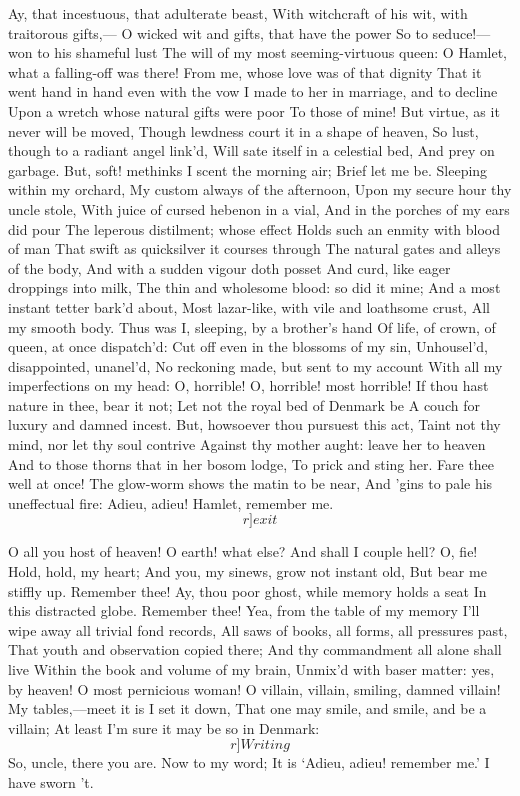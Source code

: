 \documentclass[11pt]{book}
\begin{document}
	Ay, that incestuous, that adulterate beast,
	With witchcraft of his wit, with traitorous gifts,---
	O wicked wit and gifts, that have the power
	So to seduce!---won to his shameful lust
	The will of my most seeming-virtuous queen:
	O Hamlet, what a falling-off was there!
	From me, whose love was of that dignity
	That it went hand in hand even with the vow
	I made to her in marriage, and to decline
	Upon a wretch whose natural gifts were poor
	To those of mine!
	But virtue, as it never will be moved,
	Though lewdness court it in a shape of heaven,
	So lust, though to a radiant angel link'd,
	Will sate itself in a celestial bed,
	And prey on garbage.
	But, soft! methinks I scent the morning air;
	Brief let me be. Sleeping within my orchard,
	My custom always of the afternoon,
	Upon my secure hour thy uncle stole,
	With juice of cursed hebenon in a vial,
	And in the porches of my ears did pour
	The leperous distilment; whose effect
	Holds such an enmity with blood of man
	That swift as quicksilver it courses through
	The natural gates and alleys of the body,
	And with a sudden vigour doth posset
	And curd, like eager droppings into milk,
	The thin and wholesome blood: so did it mine;
	And a most instant tetter bark'd about,
	Most lazar-like, with vile and loathsome crust,
	All my smooth body.
	Thus was I, sleeping, by a brother's hand
	Of life, of crown, of queen, at once dispatch'd:
	Cut off even in the blossoms of my sin,
	Unhousel'd, disappointed, unanel'd,
	No reckoning made, but sent to my account
	With all my imperfections on my head:
	O, horrible! O, horrible! most horrible!
	If thou hast nature in thee, bear it not;
	Let not the royal bed of Denmark be
	A couch for luxury and damned incest.
	But, howsoever thou pursuest this act,
	Taint not thy mind, nor let thy soul contrive
	Against thy mother aught: leave her to heaven
	And to those thorns that in her bosom lodge,
	To prick and sting her. Fare thee well at once!
	The glow-worm shows the matin to be near,
	And 'gins to pale his uneffectual fire:
	Adieu, adieu! Hamlet, remember me. \[r]exit\]

\1	O all you host of heaven! O earth! what else?
	And shall I couple hell? O, fie! Hold, hold, my heart;
	And you, my sinews, grow not instant old,
	But bear me stiffly up. Remember thee!
	Ay, thou poor ghost, while memory holds a seat
	In this distracted globe. Remember thee!
	Yea, from the table of my memory
	I'll wipe away all trivial fond records,
	All saws of books, all forms, all pressures past,
	That youth and observation copied there;
	And thy commandment all alone shall live
	Within the book and volume of my brain,
	Unmix'd with baser matter: yes, by heaven!
	O most pernicious woman!
	O villain, villain, smiling, damned villain!
	My tables,---meet it is I set it down,
	That one may smile, and smile, and be a villain;
	At least I'm sure it may be so in Denmark: \[r]Writing\]
	So, uncle, there you are. Now to my word;
	It is `Adieu, adieu! remember me.'
	I have sworn 't.
\end{document}
